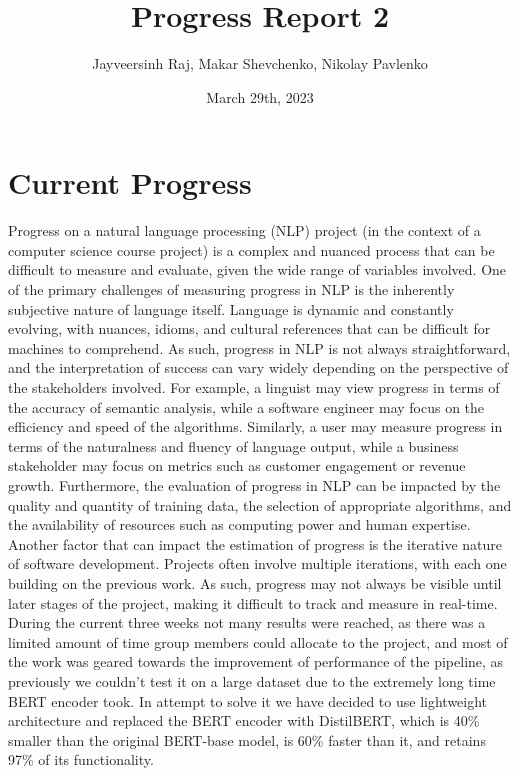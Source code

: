 \documentclass[]{article}
\title{Progress Report 2}
\author{Jayveersinh Raj, Makar Shevchenko, Nikolay Pavlenko}
\date{March 29th, 2023}
\begin{document}
	
	\maketitle
	
	\section{Current Progress}
	
	Progress on a natural language processing (NLP) project (in the context of a computer science course project) is a complex and nuanced process that can be difficult to measure and evaluate, given the wide range of variables involved. One of the primary challenges of measuring progress in NLP is the inherently subjective nature of language itself. Language is dynamic and constantly evolving, with nuances, idioms, and cultural references that can be difficult for machines to comprehend. As such, progress in NLP is not always straightforward, and the interpretation of success can vary widely depending on the perspective of the stakeholders involved. For example, a linguist may view progress in terms of the accuracy of semantic analysis, while a software engineer may focus on the efficiency and speed of the algorithms. Similarly, a user may measure progress in terms of the naturalness and fluency of language output, while a business stakeholder may focus on metrics such as customer engagement or revenue growth. Furthermore, the evaluation of progress in NLP can be impacted by the quality and quantity of training data, the selection of appropriate algorithms, and the availability of resources such as computing power and human expertise. Another factor that can impact the estimation of progress is the iterative nature of software development. Projects often involve multiple iterations, with each one building on the previous work. As such, progress may not always be visible until later stages of the project, making it difficult to track and measure in real-time. \\
	
	During the current three weeks not many results were reached, as there was a limited amount of time group members could allocate to the project, and most of the work was geared towards the improvement of performance of the pipeline, as previously we couldn't test it on a large dataset due to the extremely long time BERT encoder took. In attempt to solve it we have decided to use lightweight architecture and replaced  the BERT encoder with DistilBERT, which is 40\% smaller than the original BERT-base model, is 60\% faster than it, and retains 97\% of its functionality\cite{DistilBERT}. \\
	
\end{document}
